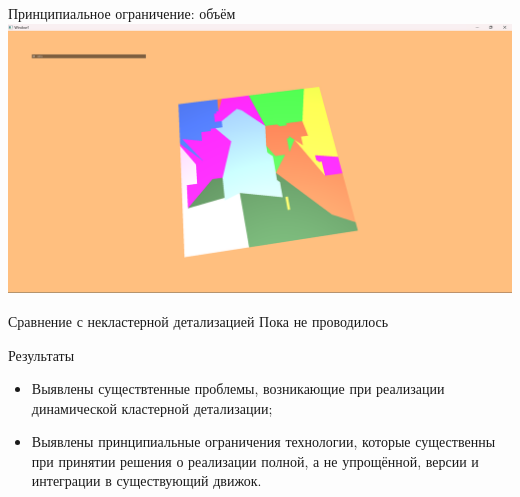 \documentclass{beamer}
\begin{document}
    \begin{frame}{Принципиальное ограничение: объём}
        \includegraphics[width=\textwidth]{plane1.png}
    \end{frame}

    \begin{frame}{Сравнение с некластерной детализацией}
        Пока не проводилось
    \end{frame}

    \begin{frame}{Результаты}
        \begin{itemize}
            \item Выявлены существтенные проблемы, возникающие при реализации динамической кластерной детализации;
            \item Выявлены принципиальные ограничения технологии, которые существенны при принятии решения о реализации полной, а не упрощённой, версии и интеграции в существующий движок.
        \end{itemize}
    \end{frame}
\end{document}
